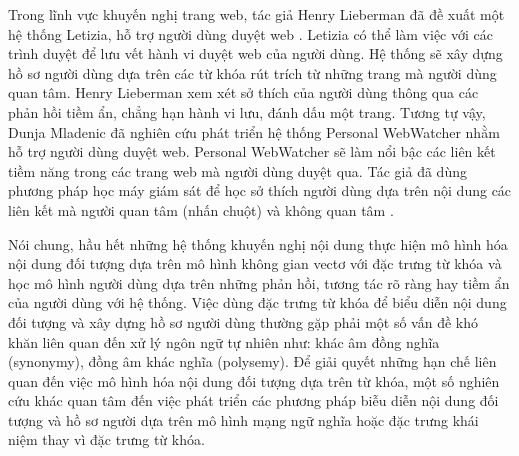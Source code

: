 Trong lĩnh vực khuyến nghị trang web, tác giả Henry Lieberman đã đề xuất một hệ thống Letizia, hỗ trợ người dùng duyệt web \cite{Lieberman:1995}. Letizia có thể làm việc với các trình duyệt để lưu vết hành vi duyệt web của người dùng. Hệ thống sẽ xây dựng hồ sơ người dùng dựa trên các từ khóa rút trích từ những trang mà người dùng quan tâm. Henry Lieberman xem xét sở thích của người dùng thông qua các phản hồi tiềm ẩn, chẳng hạn hành vi lưu, đánh dấu một trang. Tương tự vậy, Dunja Mladenic đã nghiên cứu phát triển hệ thống Personal WebWatcher nhằm hỗ trợ người dùng duyệt web. Personal WebWatcher sẽ làm nổi bậc các liên kết tiềm năng trong các trang web mà người dùng duyệt qua. Tác giả đã dùng phương pháp học máy giám sát để học sở thích người dùng dựa trên nội dung các liên kết mà người quan tâm (nhấn chuột) và không quan tâm \cite{mladenic99acai}.

Nói chung, hầu hết những hệ thống khuyến nghị nội dung thực hiện mô hình hóa nội dung đối tượng dựa trên mô hình không gian vectơ với đặc trưng từ khóa và học mô hình người dùng dựa trên những phản hồi, tương tác rõ ràng hay tiềm ẩn của người dùng với hệ thống. Việc dùng đặc trưng từ khóa để biểu diễn nội dung đối tượng và xây dựng hồ sơ người dùng thường gặp phải một số vấn đề khó khăn liên quan đến xử lý ngôn ngữ tự nhiên như: khác âm đồng nghĩa (synonymy), đồng âm khác nghĩa (polysemy). Để giải quyết những hạn chế liên quan đến việc mô hình hóa nội dung đối tượng dựa trên từ khóa, một số nghiên cứu khác quan tâm đến việc phát triển các phương pháp biễu diễn nội dung đối tượng và hồ sơ người dựa trên mô hình mạng ngữ nghĩa hoặc đặc trưng khái niệm thay vì đặc trưng từ khóa.

%

